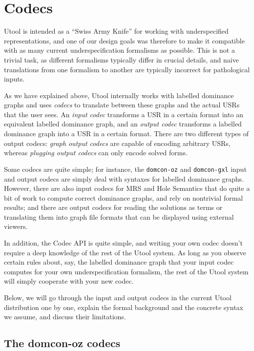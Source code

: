 \section{Codecs}  \label{sec:codecs}


Utool is intended as a ``Swiss Army Knife'' for working with
underspecified representations, and one of our design goals was
therefore to make it compatible with as many current
underspecification formalisms as possible. This is not a trivial task,
as different formalisms typically differ in crucial details, and naive
translations from one formalism to another are typically incorrect for
pathological inputs.

As we have explained above, Utool internally works with labelled
dominance graphs and uses \emph{codecs} to translate between these
graphs and the actual USRs that the user sees. An \emph{input codec}
transforms a USR in a certain format into an equivalent labelled
dominance graph, and an \emph{output codec} transforms a labelled
dominance graph into a USR in a certain format. There are two
different types of output codecs: \emph{graph output codecs} are
capable of encoding arbitrary USRs, whereas \emph{plugging output
  codecs} can only encode solved forms.

Some codecs are quite simple; for instance, the \verb?domcon-oz? and
\verb?domcon-gxl? input and output codecs are simply deal with
syntaxes for labelled dominance graphs. However, there are also input
codecs for MRS and Hole Semantics that do quite a bit of work to
compute correct dominance graphs, and rely on nontrivial formal
results; and there are output codecs for reading the solutions as
terms or translating them into graph file formats that can be
displayed using external viewers.

In addition, the Codec API is quite simple, and writing your own codec
doesn't require a deep knowledge of the rest of the Utool system. As
long as you observe certain rules about, say, the labelled dominance
graph that your input codec computes for your own underspecification
formalism, the rest of the Utool system will simply cooperate with
your new codec.

Below, we will go through the input and output codecs in the current
Utool distribution one by one, explain the formal background and the
concrete syntax we assume, and discuss their limitations.



\subsection{The domcon-oz codecs}

